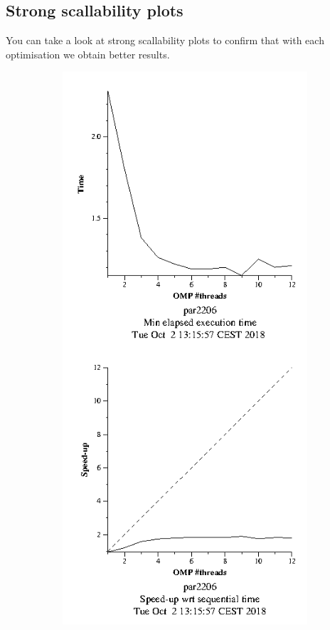\documentclass{article}
\begin{document}
\subsection*{Strong scallability plots}
You can take a look at strong scallability plots to confirm that with each optimisation we obtain better results. 
\begin{figure}[htbp]
    \centering
    \begin{subfigure}[b]{0.35\textwidth}                                        \includegraphics[width=\textwidth]{stronginitial.png}

\end{subfigure}
\end{figure}
\end{document}
